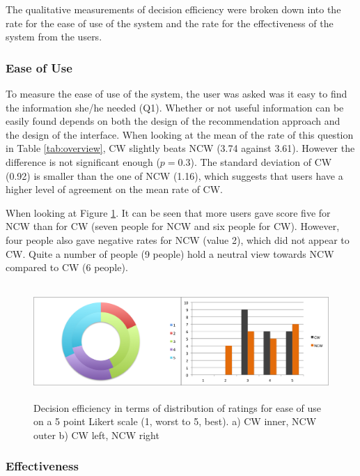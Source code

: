 The qualitative measurements of decision efficiency were broken down into the rate for the ease of use of the system and the rate for the effectiveness of the system from the users.

\subsubsection{Ease of Use} \label{sec:results_de_eu}

To measure the ease of use of the system, the user was asked was it easy to find the information she/he needed (Q1). Whether or not useful information can be easily found depends on both the design of the recommendation approach and the design of the interface. When looking at the mean of the rate of this question in Table \ref{tab:overview}, CW slightly beats NCW (3.74 against 3.61). However the difference is not significant enough ($p=0.3$). The standard deviation of CW (0.92) is smaller than the one of NCW (1.16), which suggests that users have a higher level of agreement on the mean rate of CW.

When looking at Figure \ref{fig:easeOfUse}. It can be seen that more users gave score five for NCW than for CW (seven people for NCW and six people for CW). However, four people also gave negative rates for NCW (value 2), which did not appear to CW. Quite a number of people (9 people) hold a neutral view towards NCW compared to CW (6 people).

\begin{figure}[H]
	\centering
	\includegraphics[height=1.7in]{figures/easeOfUse.png}
	\caption{Decision efficiency in terms of distribution of ratings for ease of use on a 5 point Likert scale (1, worst to 5, best). a) CW inner, NCW outer b) CW left, NCW right}
	\label{fig:easeOfUse}
\end{figure}

\subsubsection{Effectiveness} \label{sec:results_de_e}

